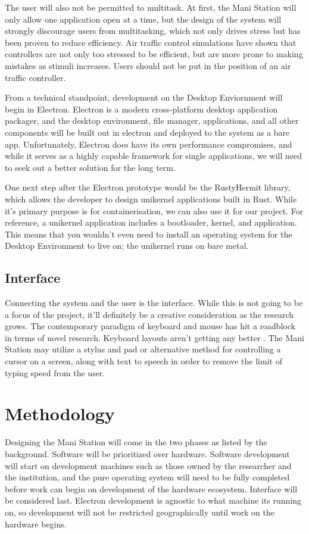 \documentclass[letterpaper,twocolumn,10pt]{article}
\begin{document}
The user will also not be permitted to multitask. At first, the Mani Station will only allow one application open at a time, but the design of the system will strongly discourage users from multitasking, which not only drives stress but has been proven to reduce efficiency. Air traffic control simulations have shown that controllers are not only too stressed to be efficient, but are more prone to making mistakes as stimuli increases.\cite{multitasking} Users should not be put in the position of an air traffic controller.

From a technical standpoint, development on the Desktop Enviornment will begin in Electron. Electron is a modern cross-platform desktop application packager, and the desktop environment, file manager, applications, and all other components will be built out in electron and deployed to the system as a bare app. Unfortunately, Electron does have its own performance compromises, and while it serves as a highly capable framework for single applications, we will need to seek out a better solution for the long term.

One next step after the Electron prototype would be the RustyHermit library, which allows the developer to design unikernel applications built in Rust. While it's primary purpose is for containerisation, we can also use it for our project. For reference, a unikernel application includes a bootloader, kernel, and application. This means that you wouldn't even need to install an operating system for the Desktop Environment to live on; the unikernel runs on bare metal.

\subsection{Interface}
Connecting the system and the user is the interface. While this is not going to be a focus of the project, it'll definitely be a creative consideration as the research grows. The contemporary paradigm of keyboard and mouse has hit a roadblock in terms of novel research. Keyboard layouts aren't getting any better \cite{keyboards}. The Mani Station may utilize a stylus and pad or alternative method for controlling a cursor on a screen, along with text to speech in order to remove the limit of typing speed from the user.

\section{Methodology}
Designing the Mani Station will come in the two phases as listed by the background. Software will be prioritized over hardware. Software development will start on development machines such as those owned by the researcher and the institution, and the pure operating system will need to be fully completed before work can begin on development of the hardware ecosystem. Interface will be considered last. Electron development is agnostic to what machine its running on, so development will not be restricted geographically until work on the hardware begins.
\end{document}
